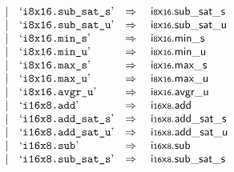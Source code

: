 $$\begin{array}[t]{@{}lrrl@{}l@{}l@{}l@{}}
& & | & \mbox{‘\texttt{i8x16.sub\_sat\_s}’} & \quad\Rightarrow\quad{} & {\mathsf{i{\scriptstyle 8}}}{\mathsf{x}}{\mathsf{{\scriptstyle 16}}} {.} {\mathsf{sub\_sat}}{\mathsf{\_}}{\mathsf{s}} \\
& & | & \mbox{‘\texttt{i8x16.sub\_sat\_u}’} & \quad\Rightarrow\quad{} & {\mathsf{i{\scriptstyle 8}}}{\mathsf{x}}{\mathsf{{\scriptstyle 16}}} {.} {\mathsf{sub\_sat}}{\mathsf{\_}}{\mathsf{u}} \\
& & | & \mbox{‘\texttt{i8x16.min\_s}’} & \quad\Rightarrow\quad{} & {\mathsf{i{\scriptstyle 8}}}{\mathsf{x}}{\mathsf{{\scriptstyle 16}}} {.} {\mathsf{min}}{\mathsf{\_}}{\mathsf{s}} \\
& & | & \mbox{‘\texttt{i8x16.min\_u}’} & \quad\Rightarrow\quad{} & {\mathsf{i{\scriptstyle 8}}}{\mathsf{x}}{\mathsf{{\scriptstyle 16}}} {.} {\mathsf{min}}{\mathsf{\_}}{\mathsf{u}} \\
& & | & \mbox{‘\texttt{i8x16.max\_s}’} & \quad\Rightarrow\quad{} & {\mathsf{i{\scriptstyle 8}}}{\mathsf{x}}{\mathsf{{\scriptstyle 16}}} {.} {\mathsf{max}}{\mathsf{\_}}{\mathsf{s}} \\
& & | & \mbox{‘\texttt{i8x16.max\_u}’} & \quad\Rightarrow\quad{} & {\mathsf{i{\scriptstyle 8}}}{\mathsf{x}}{\mathsf{{\scriptstyle 16}}} {.} {\mathsf{max}}{\mathsf{\_}}{\mathsf{u}} \\
& & | & \mbox{‘\texttt{i8x16.avgr\_u}’} & \quad\Rightarrow\quad{} & {\mathsf{i{\scriptstyle 8}}}{\mathsf{x}}{\mathsf{{\scriptstyle 16}}} {.} {\mathsf{avgr}}{\mathsf{\_}}{\mathsf{u}} \\
& & | & \mbox{‘\texttt{i16x8.add}’} & \quad\Rightarrow\quad{} & {\mathsf{i{\scriptstyle 16}}}{\mathsf{x}}{\mathsf{{\scriptstyle 8}}} {.} \mathsf{add} \\
& & | & \mbox{‘\texttt{i16x8.add\_sat\_s}’} & \quad\Rightarrow\quad{} & {\mathsf{i{\scriptstyle 16}}}{\mathsf{x}}{\mathsf{{\scriptstyle 8}}} {.} {\mathsf{add\_sat}}{\mathsf{\_}}{\mathsf{s}} \\
& & | & \mbox{‘\texttt{i16x8.add\_sat\_u}’} & \quad\Rightarrow\quad{} & {\mathsf{i{\scriptstyle 16}}}{\mathsf{x}}{\mathsf{{\scriptstyle 8}}} {.} {\mathsf{add\_sat}}{\mathsf{\_}}{\mathsf{u}} \\
& & | & \mbox{‘\texttt{i16x8.sub}’} & \quad\Rightarrow\quad{} & {\mathsf{i{\scriptstyle 16}}}{\mathsf{x}}{\mathsf{{\scriptstyle 8}}} {.} \mathsf{sub} \\
& & | & \mbox{‘\texttt{i16x8.sub\_sat\_s}’} & \quad\Rightarrow\quad{} & {\mathsf{i{\scriptstyle 16}}}{\mathsf{x}}{\mathsf{{\scriptstyle 8}}} {.} {\mathsf{sub\_sat}}{\mathsf{\_}}{\mathsf{s}} \\

\end{array}$$
